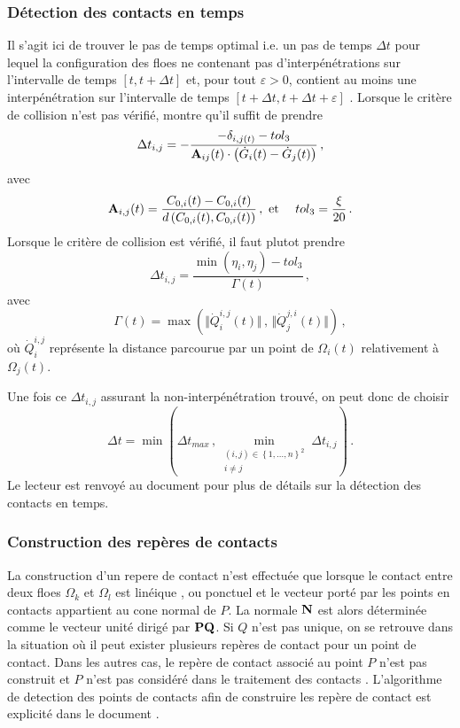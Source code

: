 \subsubsection{Détection des contacts en temps}
Il s'agit ici de trouver le pas de temps optimal i.e. un pas de temps $\Delta t$ pour lequel la configuration des floes ne contenant pas d’interpénétrations sur l’intervalle de temps $[t, t + \Delta t]$ et, pour tout $\varepsilon > 0$, contient au moins une interpénétration sur l’intervalle de temps $[t + \Delta t, t + \Delta t + \varepsilon]$ \parencite[p.87]{rabatel2015thesis}.
Lorsque le critère de collision n’est pas vérifié, \citeauthor{rabatel2015thesis} montre qu'il suffit de prendre 
$$
\Delta t_{i,j} = -\frac{-\delta_{i,j(t)} - tol_3}{\bm{\mathrm{A}}_{ij}(t) \cdot \left( \dot{G}_i(t) - \dot{G}_j(t) \right)} \,,
$$
avec 
$$
\bm{\mathrm{A}}_{i,j}(t) = \frac{C_{0,i}(t) - C_{0,i}(t)}{d\left(C_{0,i}(t), C_{0,i}(t) \right)} \,, \text{ et  } \quad tol_3 = \frac{\xi}{20} \,.
$$
Lorsque le critère de collision est vérifié, il faut plutot prendre 
$$
\Delta t_{i,j} = \frac{\min{\left( \eta_i, \eta_j \right) - tol_3}}{\Gamma(t)} \,,
$$
avec 
$$
\Gamma(t) = \max{\left( \Vert \dot{Q}_i^{i,j}(t) \Vert \,, \, \Vert \dot{Q}_j^{j,i}(t) \Vert  \right)} \,,
$$
où $\dot{Q}_i^{i,j}$ représente la distance parcourue par un point de $\Omega_i (t)$ relativement à $\Omega_j (t)$.

Une fois ce $\Delta t_{i,j}$ assurant la non-interpénétration trouvé, on peut donc de choisir 
$$
\Delta t = \min{\left( \Delta t_{max} \,, \min_{ \substack{ (i,j) \in \left\{ 1,\ldots,n \right\}^2 \\ i \neq j}}{\Delta t_{i,j}} \right)} \,.
$$
Le lecteur est renvoyé au document \parencite[p.91]{rabatel2015thesis} pour plus de détails sur la détection des contacts en temps.

\subsubsection{Construction des repères de contacts}

La construction d'un repere de contact n'est effectuée que lorsque le contact entre deux floes $\Omega_k$ et $\Omega_l$ est linéique \parencite[p.79]{rabatel2015thesis}, ou ponctuel et le vecteur porté par les points en contacts appartient au cone normal de $P$. La normale $\bm{\mathrm{N}}$ est alors déterminée comme le vecteur unité dirigé par $\bm{\mathrm{PQ}}$. Si $Q$ n’est pas unique, on se retrouve dans la situation où il peut exister plusieurs repères de contact pour un point de contact. Dans les autres cas, le repère de contact associé au point $P$ n’est pas construit et $P$ n’est pas considéré dans le traitement des contacts \parencite[p.80]{rabatel2015thesis}. L'algorithme de detection des points de contacts afin de construire les repère de contact est explicité dans le document \parencite[p.76]{rabatel2015thesis}. 


